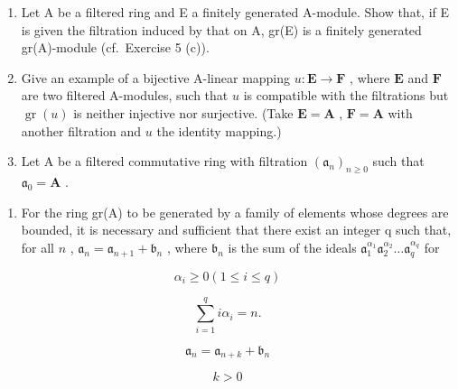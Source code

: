 \begin{enumerate}
\def\labelenumi{\arabic{enumi}.}
\setcounter{enumi}{2}
\item
  Let A be a filtered ring and E a finitely generated A-module. Show that, if E is given the filtration induced by that on A, gr(E) is a finitely generated gr(A)-module (cf.~Exercise 5 (c)).
\item
  Give an example of a bijective A-linear mapping \(u \colon \mathbf{E} \to \mathbf{F}\) , where \(\mathbf{E}\) and \(\mathbf{F}\) are two filtered A-modules, such that \(u\) is compatible with the filtrations but \(\operatorname{gr}(u)\) is neither injective nor surjective. (Take \(\mathbf{E} = \mathbf{A}\) , \(\mathbf{F} = \mathbf{A}\) with another filtration and \(u\) the identity mapping.)
\item
  Let A be a filtered commutative ring with filtration \((\mathfrak{a}_n)_{n\geqslant 0}\) such that \(\mathfrak{a}_0 = \mathbf{A}\) .
\end{enumerate}

\begin{enumerate}
\def\labelenumi{(\alph{enumi})}
\tightlist
\item
  For the ring gr(A) to be generated by a family of elements whose degrees are bounded, it is necessary and sufficient that there exist an integer q such that, for all \(n\) , \(\mathfrak{a}_n = \mathfrak{a}_{n+1} + \mathfrak{b}_n\) , where \(\mathfrak{b}_n\) is the sum of the ideals \(\mathfrak{a}_1^{\alpha_1}\mathfrak{a}_2^{\alpha_2}\ldots\mathfrak{a}_q^{\alpha_q}\) for
\end{enumerate}

\[
\alpha_ {i} \geqslant 0 (1 \leqslant i \leqslant q)
\]

\[
\sum_ {i = 1} ^ {q} i \alpha_ {i} = n.
\]

\[
\mathfrak {a} _ {n} = \mathfrak {a} _ {n + k} + \mathfrak {b} _ {n}
\]

\[
k > 0
\]

